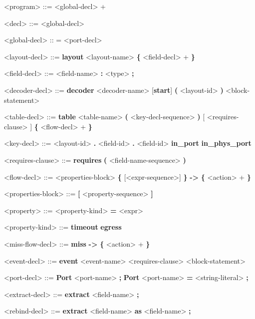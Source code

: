 \begin{mdframed}
\begin{grammar}

<program> ::= <global-decl> +

<decl> ::=
<global-decl>

<global-decl> :: =
<port-decl>

<layout-decl> ::=
\textbf{layout} <layout-name> 
\textbf{\{}
	<field-decl> +
\textbf{\}}

<field-decl> ::=
<field-name> \textbf{:} <type> \textbf{;}

<decoder-decl> ::=
\textbf{decoder} <decoder-name> [\textbf{start}] 
\textbf{(} <layout-id> \textbf{)}
<block-statement>

<table-decl> ::=
\textbf{table} <table-name> \textbf{(} <key-decl-sequence> \textbf{)} 
[ <requires-clause> ]
\textbf{\{} 
<flow-decl> + 
\textbf{\}}

<key-decl> ::=
<layout-id> \textbf{.} <field-id>
 \textbf{.} <field-id>
\alt \textbf{in\_port}
\alt \textbf{in\_phys\_port}

<requires-clause> ::=
\textbf{requires} \textbf{(} <field-name-sequence> \textbf{)}

<flow-decl> ::=
<properties-block>
\textbf{\{} [<expr-sequence>] \textbf{\}} \textbf{-\textgreater}
\textbf{\{} 
<action> +
\textbf{\}}

<properties-block> ::=
\textbf{[} <property-sequence> \textbf{]}

<property> ::=
<property-kind> \textbf{=} <expr>

<property-kind> ::=
\textbf{timeout}
\alt \textbf{egress}

<miss-flow-decl> ::=
\textbf{miss} \textbf{-\textgreater}
\textbf{\{} 
<action> +
\textbf{\}}

<event-decl> ::=
\textbf{event} <event-name> <requires-clause> 
<block-statement>

<port-decl> ::=
\textbf{Port} <port-name> \textbf{;}
\alt \textbf{Port} <port-name> \textbf{=} <string-literal> \textbf{;}

<extract-decl> ::=
\textbf{extract} <field-name> \textbf{;}

<rebind-decl> ::=
\textbf{extract} <field-name> \textbf{as} <field-name> \textbf{;}


\end{grammar}
\end{mdframed}
